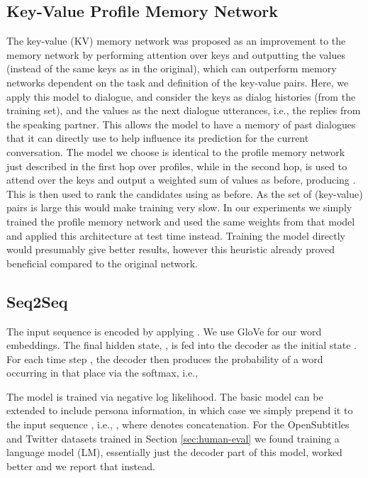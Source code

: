 \documentclass[11pt,a4paper]{article}
\begin{document}
\subsection{Key-Value Profile Memory Network}\label{sec:kvmem}

The key-value (KV) memory network \cite{miller2016key} was proposed as an improvement to the memory network by performing attention over keys and outputting the values (instead of the same keys as in the original), which can outperform memory networks dependent on the task and definition of the key-value pairs. Here, we apply this model to dialogue, and consider the keys as dialog histories (from the training set), and the values as the next dialogue utterances, i.e., the replies from the speaking partner. 
This allows the model to have a memory of past dialogues that it can directly use to help influence its prediction for the current conversation. 
The model we choose is identical to the profile memory network just described in the first hop over profiles, while in the second hop,  is used to attend over the keys and output a weighted sum of values as before, producing 
. This is then used to rank the candidates   using  as before.  As the set of (key-value) pairs is large this would make training very slow. In our experiments we simply trained the profile memory network and used the same weights from that model and applied this architecture at test time instead. Training the model directly would presumably give better results, however this heuristic already proved beneficial compared to the original network. 



\subsection{Seq2Seq}

The input sequence  is encoded by applying . We use GloVe \citep{pennington2014glove} for our word embeddings. The final hidden state, , is fed into the decoder  as the initial state . For each time step , the decoder then produces the probability of a word  occurring in that place via the softmax, i.e.,

The model is trained via negative log likelihood. The basic model can be extended to include persona information, in which case we simply prepend it to the input sequence , i.e., , where  denotes concatenation.
For the OpenSubtitles and Twitter datasets trained in Section \ref{sec:human-eval} we found training a language model (LM), essentially just the decoder part of this model, worked better and we report that instead.
\end{document}

